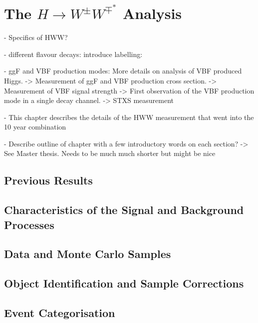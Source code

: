 \chapter{The $H\rightarrow W^{\pm}W^{\mp^*}$ Analysis}
\label{chap:hww}

- Specifics of HWW?

- different flavour decays: introduce labelling: \HWWdet 

- ggF and VBF production modes: More details on analysis of VBF produced Higgs. 
    -> Measurement of ggF and VBF production cross section.
    -> Measurement of VBF signal strength -> First observation of the VBF production mode in a single decay channel. 
    -> STXS measurement

- This chapter describes the details of the HWW measurement that went into the 10 year combination

- Describe outline of chapter with a few introductory words on each section?
    -> See Master thesis. Needs to be much much shorter but might be nice



\section{Previous Results}
\label{sec:prev-results}



\section{Characteristics of the Signal and Background Processes}
\label{sec:signal-bkg-characteristics}



\section{Data and Monte Carlo Samples}
\label{sec:data-mc-samples}



\section{Object Identification and Sample Corrections}
\label{sec:object-selection}



\section{Event Categorisation}
\label{sec:event-categorisation}



